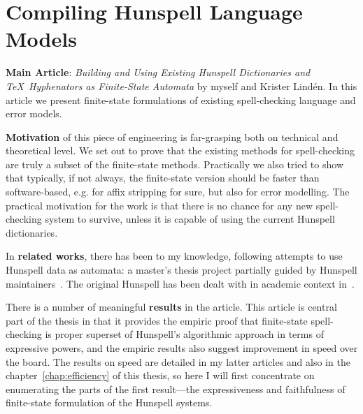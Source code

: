 \documentclass[officiallayout]{unihelcompling}
\begin{document}
\section{Compiling Hunspell Language Models}
\label{sec:Hunspell}

\textbf{Main Article}: \emph{Building and Using Existing Hunspell Dictionaries
and \TeX\ Hyphenators as Finite-State Automata} by myself and Krister Lindén.
In this article we present finite-state formulations of existing spell-checking
language and error models.

\textbf{Motivation} of this piece of engineering is far-grasping both on 
technical and theoretical level. We set out to prove that the existing
methods for spell-checking are truly a subset of the finite-state methods.
Practically we also tried to show that typically, if not always, the 
finite-state version should be faster than software-based, e.g. for affix
stripping for sure, but also for error modelling. The practical motivation
for the work is that there is no chance for any new spell-checking system to
survive, unless it is capable of using the current Hunspell dictionaries.

In \textbf{related works}, there has been to my knowledge, following
attempts to use Hunspell data as automata: a master's thesis project partially
guided by Hunspell maintainers~\citep{greenfield2010open}.
The
original Hunspell has been dealt with in academic context 
in~\citet{tron2005hunmorph}.

There is a number of meaningful \textbf{results} in the article. This article
is central part of the thesis in that it provides the empiric proof that
finite-state spell-checking is proper superset of Hunspell's algorithmic 
approach in terms of expressive powers, and the empiric results also suggest
improvement in speed over the board. The results on speed are detailed in my
latter articles and also in the chapter~\ref{chap:efficiency} of this thesis,
so here I will first concentrate on enumerating the parts of the first
result---the expressiveness and faithfulness of finite-state formulation of
the Hunspell systems.
\end{document}
